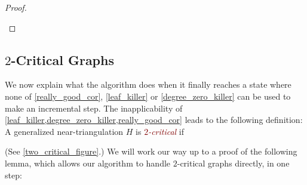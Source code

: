 \documentclass{article}
\newcommand{\pat}[1]{\textcolor{red}{PM: #1}}
\newcommand{\defin}[1]{\emph{\textcolor{Maroon}{#1}}}
\theoremstyle{definition}
\begin{document}
\begin{proof}
\begin{enumerate}[(i)]
  \end{enumerate}
\end{proof}



\subsection{$2$-Critical Graphs}
\label{two_critical_section}

We now explain what the algorithm does when it finally reaches a state where  none of \cref{really_good_cor}, \cref{leaf_killer} or \cref{degree_zero_killer} can be used to make an incremental step.  The inapplicability of \cref{leaf_killer,degree_zero_killer,really_good_cor} leads to the following definition:
A generalized near-triangulation $H$ is \defin{$2$-critical} if
(See \cref{two_critical_figure}.) We will work our way up to a proof of the following lemma, which allows our algorithm to handle $2$-critical graphs directly, in one step:
\end{document}
